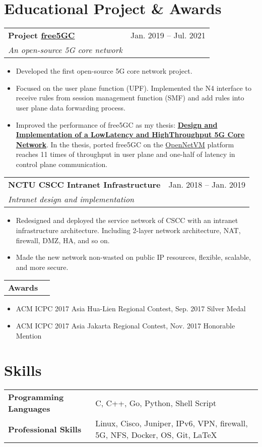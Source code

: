 \documentclass[letterpaper,11pt]{article}
\makeatletter
\newcommand{\resumeItemTwo}[1]{
  \item\small{
    {#1 \vspace{-2pt}}
  }
}
\newcommand{\resumeSubheading}[4]{
  \vspace{1pt}%
    \begin{tabular*}{0.97\textwidth}{l@{\extracolsep{\fill}}r}
      \textbf{#1} & #2 \\
      \textit{\small#3} & \textit{\small #4} \\
    \end{tabular*}\vspace{-5pt}
}
\newcommand{\resumeSubheadingOne}[2]{
  \vspace{-1pt}%
    \begin{tabular*}{0.97\textwidth}{l@{\extracolsep{\fill}}r}
      \textbf{#1} & #2 \\
    \end{tabular*}\vspace{-5pt}
}
\newcommand{\resumeSubHeadingListStart}{}%
\newcommand{\resumeSubHeadingListEnd}{}%
\newcommand{\resumeItemListStart}{\begin{itemize}}
\newcommand{\resumeItemListEnd}{\end{itemize}\vspace{-5pt}}
\makeatother
\begin{document}
\section{Educational Project \& Awards}
  \resumeSubHeadingListStart
    \resumeSubheading
     {Project \href{https://www.free5gc.org/}{free5GC}}{Jan. 2019 -- Jul. 2021}
      {An open-source 5G core network}{}
      \resumeItemListStart
        \resumeItemTwo{Developed the first open-source 5G core network project.}
        \resumeItemTwo{Focused on the user plane function (UPF). Implemented the N4 interface to receive rules from session management function (SMF) and add rules into user plane data forwarding process.}
        \resumeItemTwo{Improved the performance of free5GC as my thesis: \textbf{\href{https://hdl.handle.net/11296/44vnys}{Design and Implementation of a Low­Latency and High­Throughput 5G Core Network}}. In the thesis, ported free5GC on the \href{http://sdnfv.github.io/onvm/}{OpenNetVM} platform reaches 11 times of throughput in user plane and one-half of latency in control plane communication.}
      \resumeItemListEnd
    \resumeSubheading
     {NCTU CSCC Intranet Infrastructure}{Jan. 2018 -- Jan. 2019}
      {Intranet design and implementation}{}
      \resumeItemListStart
        \resumeItemTwo{Redesigned and deployed the service network of CSCC with an intranet infrastructure architecture. Including 2-layer network architecture, NAT, firewall, DMZ, HA, and so on.}
        \resumeItemTwo{Made the new network non-wasted on public IP resources, flexible, scalable, and more secure.}
      \resumeItemListEnd
    \resumeSubheadingOne
     {Awards}{}
      \resumeItemListStart
        \resumeItemTwo{ACM ICPC 2017 Asia Hua-Lien Regional Contest, Sep. 2017}{Silver Medal}
        \resumeItemTwo{ACM ICPC 2017 Asia Jakarta Regional Contest, Nov. 2017}{Honorable Mention}
      \resumeItemListEnd
  \resumeSubHeadingListEnd

\section{Skills}
    \begin{tabular}{ l l }
     \textbf{Programming Languages}\qquad \qquad & C, C++, Go, Python, Shell Script\\
     \textbf{Professional Skills} & Linux, Cisco, Juniper, IPv6, VPN, firewall, 5G, NFS, Docker, OS, Git, \LaTeX\\
     \end{tabular}
\end{document}

